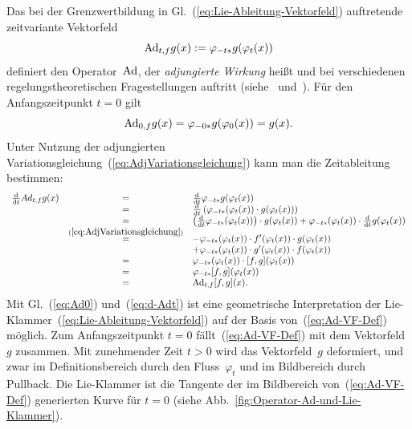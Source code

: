 Das bei der Grenzwertbildung in Gl.~(\ref{eq:Lie-Ableitung-Vektorfeld})
auftretende zeitvariante Vektorfeld 
\begin{equation}
{\operatorname{Ad}}_{t,f}g(x):=\varphi_{-t*}g(\varphi_{t}(x))\label{eq:Ad-VF-Def}
\end{equation}
definiert den Operator~${\operatorname{Ad}}$, der \emph{adjungierte Wirkung}
heißt und bei verschiedenen regelungstheoretischen Fragestellungen
auftritt (siehe~\cite{krener85} und~\cite[Abschnitt~{4.4}]{sontag98}).
Für den Anfangszeitpunkt $t=0$ gilt 
\begin{equation}
{\operatorname{Ad}}_{0,f}g(x)=\varphi_{-0*}g(\varphi_{0}(x))=g(x).\label{eq:Ad0}
\end{equation}
Unter Nutzung der adjungierten Variationsgleichung~(\ref{eq:AdjVariationsgleichung})
kann man die Zeitableitung bestimmen: 
\begin{equation}
\begin{array}{ccl}
\frac{{\mathrm{d}}}{{\mathrm{d}} t}Ad_{t,f}g(x) & = & \frac{{\mathrm{d}}}{{\mathrm{d}} t}\varphi_{-t*}g(\varphi_{t}(x))\\
 & = & \frac{{\mathrm{d}}}{{\mathrm{d}} t}\left(\varphi_{-t*}(\varphi_{t}(x))\cdot g(\varphi_{t}(x))\right)\\
 & = & \left(\frac{{\mathrm{d}}}{{\mathrm{d}} t}\varphi_{-t*}(\varphi_{t}(x))\right)\cdot g(\varphi_{t}(x))+\varphi_{-t*}(\varphi_{t}(x))\cdot\frac{{\mathrm{d}}}{{\mathrm{d}} t}g(\varphi_{t}(x))\\
 & \stackrel{(\ref{eq:AdjVariationsgleichung})}{=} & -\varphi_{-t*}(\varphi_{t}(x))\cdot f^{\prime}(\varphi_{t}(x))\cdot g(\varphi_{t}(x))\\
 &  & +\varphi_{-t*}(\varphi_{t}(x))\cdot g^{\prime}(\varphi_{t}(x))\cdot f(\varphi_{t}(x))\\
 & = & \varphi_{-t*}(\varphi_{t}(x))\cdot[f,g](\varphi_{t}(x))\\
 & = & \varphi_{-t*}[f,g](\varphi_{t}(x))\\
 & = & {\operatorname{Ad}}_{t,f}[f,g](x).
\end{array}\label{eq:d-Adt}
\end{equation}
Mit Gl.~(\ref{eq:Ad0}) und~(\ref{eq:d-Adt}) ist eine geometrische
Interpretation der Lie-Klammer~(\ref{eq:Lie-Ableitung-Vektorfeld})
auf der Basis von~(\ref{eq:Ad-VF-Def}) möglich. Zum Anfangszeitpunkt
$t=0$ fällt~(\ref{eq:Ad-VF-Def}) mit dem Vektorfeld~$g$ zusammen.
Mit zunehmender Zeit $t>0$ wird das Vektorfeld~$g$ deformiert,
und zwar im Definitionsbereich durch den Fluss~$\varphi_{t}$ und
im Bildbereich durch Pullback. Die Lie-Klammer ist die Tangente der
im Bildbereich von~(\ref{eq:Ad-VF-Def}) generierten Kurve für $t=0$
(siehe Abb.~\ref{fig:Operator-Ad-und-Lie-Klammer}).

